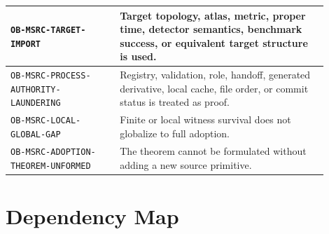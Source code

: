 \documentclass[11pt]{article}
\begin{document}
\begin{longtable}{|p{0.31\linewidth}|p{0.59\linewidth}|}
\hline
\texttt{OB-MSRC-TARGET-IMPORT} & Target topology, atlas, metric, proper time, detector semantics, benchmark success, or equivalent target structure is used. \\
\hline
\texttt{OB-MSRC-PROCESS-AUTHORITY-LAUNDERING} & Registry, validation, role, handoff, generated derivative, local cache, file order, or commit status is treated as proof. \\
\hline
\texttt{OB-MSRC-LOCAL-GLOBAL-GAP} & Finite or local witness survival does not globalize to full adoption. \\
\hline
\texttt{OB-MSRC-ADOPTION-THEOREM-UNFORMED} & The theorem cannot be formulated without adding a new source primitive. \\
\hline
\end{longtable}

\section{Dependency Map}
\end{document}

